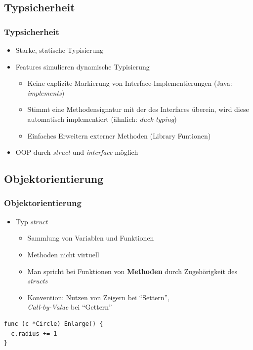 \documentclass{beamer}
\begin{document}
\subsection{Typsicherheit}
\begin{frame}
\frametitle{Typsicherheit}

\begin{itemize}
\setlength{\itemsep}{24pt}
\item Starke, statische Typisierung
\item Features simulieren dynamische Typisierung
\begin{itemize}
\setlength{\itemsep}{12pt}
\item Keine explizite Markierung von Interface-Implementierungen (Java: \textit{implements})
\item Stimmt eine Methodensignatur mit der des Interfaces \"uberein, wird diese automatisch implementiert (\"ahnlich: \textit{duck-typing})
\item Einfaches Erweitern externer Methoden (Library Funtionen)
\end{itemize}
\item OOP durch \textit{struct} und \textit{interface} m\"oglich
\end{itemize}

\end{frame}


\subsection{Objektorientierung}
\begin{frame}[fragile]
\frametitle{Objektorientierung}

\begin{itemize}
\item Typ \textit{struct}
\begin{itemize}
\setlength{\itemsep}{12pt}
\item Sammlung von Variablen und Funktionen
\item Methoden nicht virtuell
\item Man spricht bei Funktionen von \textbf{Methoden} durch Zugeh\"origkeit des \textit{structs}
\item Konvention: Nutzen von Zeigern bei ``Settern'',\\ \textit{Call-by-Value} bei ``Gettern''
\end{itemize}
\end{itemize}

\begin{lstlisting}
func (c *Circle) Enlarge() {
  c.radius += 1
}
\end{lstlisting}

\end{frame}
\end{document}
